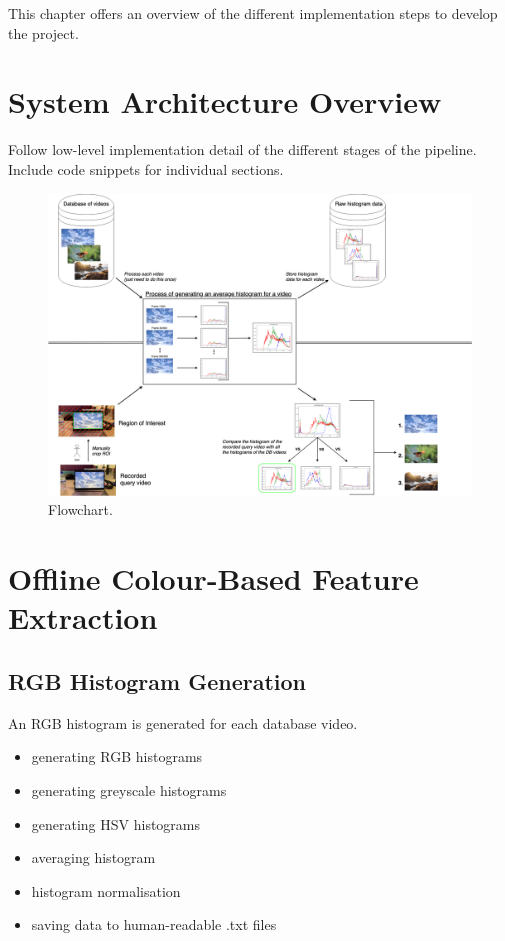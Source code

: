 This chapter offers an overview of the different implementation steps to develop the project.

\section{System Architecture Overview}

Follow low-level implementation detail of the different stages of the pipeline.\\

Include code snippets for individual sections.

\begin{figure}[h] 
\centerline{\includegraphics[width=\textwidth]{figures/implementation/CBVR-flowchart.png}}
\caption{\label{fig:CBVR flowchart}Flowchart.}
\end{figure}

\section{Offline Colour-Based Feature Extraction}

\subsection{RGB Histogram Generation}

An RGB histogram is generated for each database video. 

\begin{itemize}
    \item generating RGB histograms
    \item generating greyscale histograms
    \item generating HSV histograms
    \item averaging histogram
    \item histogram normalisation
    \item saving data to human-readable .txt files
\end{itemize}


